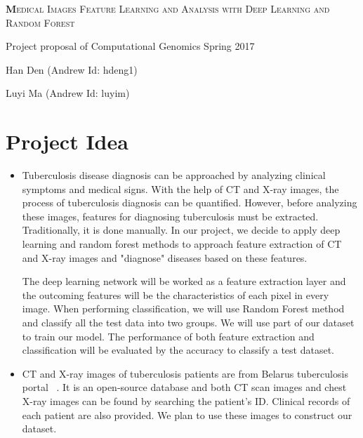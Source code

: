 \documentclass[letterpaper, 11pt]{article}
\begin{document}
\begin{center}
{\Large
	\textsc{\textbf Medical Images Feature Learning and Analysis with Deep Learning and Random Forest}
}

\vspace{0.3cm}

\normalsize Project proposal of Computational Genomics Spring 2017

\vspace{0.5cm}

{\small
	Han Den (Andrew Id: hdeng1)
	
	Luyi Ma (Andrew Id: luyim)
}
\end{center}

\section{Project Idea}

\begin{itemize}
\item
Tuberculosis disease diagnosis can be approached by analyzing clinical symptoms and medical signs. With the help of CT and X-ray images, the process of tuberculosis diagnosis can be quantified. However, before analyzing these images, features for diagnosing tuberculosis must be extracted. Traditionally, it is done manually. In our project, we decide to apply deep learning and random forest methods to approach feature extraction of CT and X-ray images and "diagnose" diseases based on these features.

The deep learning network will be worked as a feature extraction layer and the outcoming features will be the characteristics of each pixel in every image. When performing classification, we will use Random Forest method and classify all the test data into two groups. We will use part of our dataset to train our model. The performance of both feature extraction and classification will be evaluated by the accuracy to classify a test dataset. 

\item 
CT and X-ray images of tuberculosis patients are from Belarus tuberculosis portal
~\cite{TB_database}.
It is an open-source database and both CT scan images and chest X-ray images can be found by searching the patient's ID. Clinical records of each patient are also provided. We plan to use these images to construct our dataset.
\end{itemize}

\end{document}
